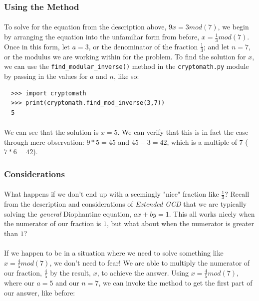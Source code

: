 \documentclass[12pt,a4paper]{article}
\begin{document}
\subsubsection{Using the Method}
\paragraph{}
To solve for the equation from the description above, $9x = 3 mod(7)$, we begin 
by arranging the equation into the unfamiliar form from before, 
$x = \frac{1}{3} mod(7)$.  Once in this form, let $a = 3$, or the denominator 
of the fraction $\frac{1}{3}$; and let $n = 7$, or the modulus we are working 
within for the problem.  To find the solution for $x$, we can use the 
\verb|find_modular_inverse()| method in the \verb|cryptomath.py| module by 
passing in the values for $a$ and $n$, like so:

\begin{verbatim}
  >>> import cryptomath
  >>> print(cryptomath.find_mod_inverse(3,7))
  5 
\end{verbatim}

\paragraph{}
We can see that the solution is $x = 5$.  We can verify that this is in fact 
the case through mere observation: $9*5 = 45$ and $45 - 3 = 42$, which is a 
multiple of $7$ ($7*6 = 42$).

\subsubsection{Considerations}
\paragraph{}
What happens if we don't end up with a seemingly "nice" fraction like 
$\frac{1}{3}$?  Recall from the description and considerations of 
\textit{Extended GCD} that we are typically solving the \textit{general} 
Diophantine equation, $ax + by = 1$.  This all works nicely when the numerator 
of our fraction is $1$, but what about when the numerator is greater than $1$?

\paragraph{}
If we happen to be in a situation where we need to solve something like 
$x = \frac{4}{5} mod(7)$, we don't need to fear!  We are able to multiply the 
numerator of our fraction, $\frac{4}{5}$ by the result, $x$, to achieve the 
answer.  Using $x = \frac{4}{5} mod(7)$, where our $a = 5$ and our $n = 7$, we 
can invoke the method to get the first part of our answer, like before:
\end{document}
